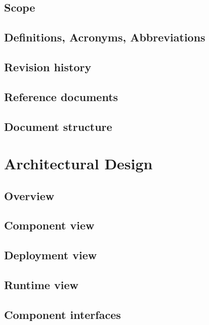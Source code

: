 \documentclass[a4paper,oneside,11pt]{article}
\begin{document}
        \subsection{Scope}
            
        \subsection{Definitions, Acronyms, Abbreviations}
            
        \subsection{Revision history}
            
        \subsection{Reference documents}
            
        \subsection{Document structure}
            
        
    \newpage
    \section{Architectural Design}
        \subsection{Overview}
            
        \subsection{Component view}
            
        \subsection{Deployment view}
            
        \subsection{Runtime view}
            
        \subsection{Component interfaces}
            
\end{document}
